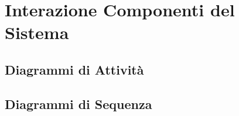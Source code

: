 
\section{Interazione Componenti del Sistema}

\subsection{Diagrammi di Attività}



\subsection{Diagrammi di Sequenza}


